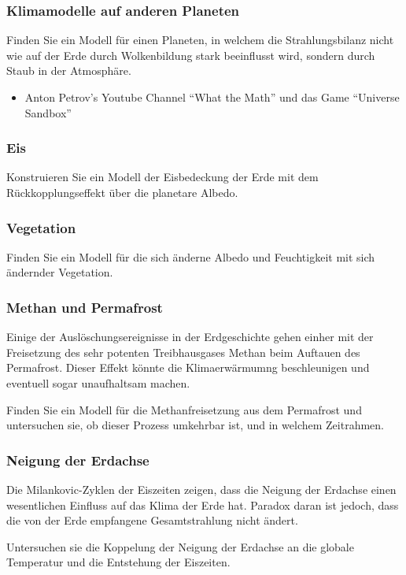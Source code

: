 \begin{frame}
\frametitle{Klimamodelle auf anderen Planeten}
\begin{aufgabe}
Finden Sie ein Modell für einen Planeten, in welchem die Strahlungsbilanz
nicht wie auf der Erde durch Wolkenbildung stark beeinflusst wird, sondern
durch Staub in der Atmosphäre.
\end{aufgabe}
\begin{itemize}
\item
Anton Petrov's Youtube Channel ``What the Math'' und das
Game ``Universe Sandbox''
\end{itemize}
\end{frame}

\begin{frame}
\frametitle{Eis}
\begin{aufgabe}
Konstruieren Sie ein Modell der Eisbedeckung der Erde mit dem
Rückkopplungseffekt über die planetare Albedo.
\end{aufgabe}
\end{frame}

\begin{frame}
\frametitle{Vegetation}
\begin{aufgabe}
Finden Sie ein Modell für die sich änderne Albedo und Feuchtigkeit 
mit sich ändernder Vegetation.
\end{aufgabe}
\end{frame}

\begin{frame}
\frametitle{Methan und Permafrost}
Einige der Auslöschungsereignisse in der Erdgeschichte gehen einher
mit der Freisetzung des sehr potenten Treibhausgases Methan beim Auftauen
des Permafrost.
Dieser Effekt könnte die Klimaerwärmumng beschleunigen und eventuell
sogar unaufhaltsam machen.

\begin{aufgabe}
Finden Sie ein Modell für die Methanfreisetzung aus dem Permafrost und 
untersuchen sie, ob dieser Prozess umkehrbar ist, und in welchem Zeitrahmen.
\end{aufgabe}
\end{frame}

\begin{frame}
\frametitle{Neigung der Erdachse}
Die Milankovic-Zyklen der Eiszeiten zeigen, dass die Neigung der Erdachse
einen wesentlichen Einfluss auf das Klima der Erde hat.
Paradox daran ist jedoch, dass die von der Erde empfangene Gesamtstrahlung
nicht ändert.

\begin{aufgabe}
Untersuchen sie die Koppelung der Neigung der Erdachse an die globale
Temperatur und die Entstehung der Eiszeiten.
\end{aufgabe}
\end{frame}

